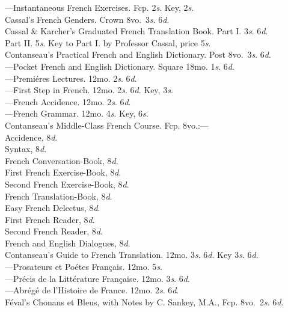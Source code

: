 \documentclass[letterpaper,12pt,oneside,openany]{memoir}
\newcommand{\D}{\hspace*{5mm}}
\newcommand{\E}{\hspace*{2mm}---\hspace*{2mm}}
\begin{document}
\begin{footnotesize}
\E Instantaneous French Exercises. Fcp. 2\textit{s}. Key, 2\textit{s}.\\
Cassal's French Genders. Crown 8vo.\ 3\textit{s}. 6\textit{d}.\\
Cassal \& Karcher's Graduated French Translation Book.  Part I. 3\textit{s}. 6\textit{d}.\\
Part II. 5\textit{s}. Key to Part I. by Professor Cassal, price 5\textit{s}.\\
Contanseau's Practical French and English Dictionary. Post 8vo.\ 3\textit{s}. 6\textit{d}.\\
\E Pocket French and English Dictionary. Square 18mo. 1\textit{s}. 6\textit{d}.\\
\E Premi{\'e}res Lectures. 12mo. 2\textit{s}. 6\textit{d}.\\
\E First Step in French. 12mo. 2\textit{s}. 6\textit{d}. Key, 3\textit{s}.\\
\E French Accidence. 12mo. 2\textit{s}. 6\textit{d}.\\
\E French Grammar. 12mo. 4\textit{s}. Key, 6\textit{s}.\\
Contanseau's Middle-Class French Course. Fcp. 8vo.:---\\
\D Accidence, 8\textit{d}.\\
\D Syntax, 8\textit{d}.\\
\D French Conversation-Book, 8\textit{d}.\\
\D First French Exercise-Book, 8\textit{d}.\\
\D Second French Exercise-Book, 8\textit{d}.\\
\D French Translation-Book, 8\textit{d}.\\
\D Easy French Delectus, 8\textit{d}.\\
\D First French Reader, 8\textit{d}.\\
\D Second French Reader, 8\textit{d}.\\
\D French and English Dialogues, 8\textit{d}.\\
Contanseau's Guide to French Translation. 12mo. 3\textit{s}. 6\textit{d}. Key 3\textit{s}. 6\textit{d}.\\
\E Prosateurs et Po{\'e}tes Fran{\c c}ais. 12mo. 5\textit{s}.\\
\E Pr{\'e}cis de la Litt{\'e}rature Fran{\c c}aise. 12mo. 3\textit{s}. 6\textit{d}.\\
\E Abr{\'e}g{\'e} de l'Histoire de France. 12mo. 2\textit{s}. 6\textit{d}.\\
F{\'e}val's Chonans et Bleus, with Notes by C. Sankey, M.A., Fcp. 8vo.\ 2\textit{s}. 6\textit{d}.\\

\end{footnotesize}
\end{document}
